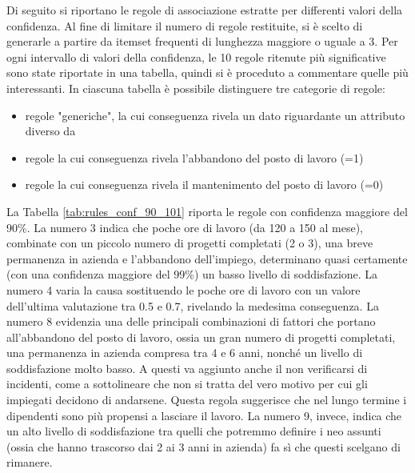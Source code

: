 \documentclass[a4paper]{article}
\begin{document}
Di seguito si riportano le regole di associazione estratte per differenti valori della confidenza. Al fine di limitare il numero di regole restituite, si è scelto di generarle a partire da itemset frequenti di lunghezza maggiore o uguale a 3. 
Per ogni intervallo di valori della confidenza, le 10 regole ritenute più significative sono state riportate in una tabella, quindi si è proceduto a commentare quelle più interessanti. In ciascuna tabella è possibile distinguere tre categorie di regole:
\begin{itemize}
\setlength\itemsep{1pt}
\item regole "generiche", la cui conseguenza rivela un dato riguardante un attributo diverso da 
\item regole la cui conseguenza rivela l'abbandono del posto di lavoro (=1)
\item regole la cui conseguenza rivela il mantenimento del posto di lavoro (=0)
\end{itemize}
\noindent
La Tabella \ref{tab:rules_conf_90_101} riporta le regole con confidenza maggiore del 90\%. La numero 3 indica che poche ore di lavoro (da 120 a 150 al mese), combinate con un piccolo numero di progetti completati (2 o 3), una breve permanenza in azienda e l'abbandono dell'impiego, determinano quasi certamente (con una confidenza maggiore del 99\%) un basso livello di soddisfazione. La numero 4 varia la causa sostituendo le poche ore di lavoro con un valore dell'ultima valutazione tra 0.5 e 0.7, rivelando la medesima conseguenza. 
La numero 8 evidenzia una delle principali combinazioni di fattori che portano all'abbandono del posto di lavoro, ossia un gran numero di progetti completati, una permanenza in azienda compresa tra 4 e 6 anni, nonché un livello di soddisfazione molto basso. A questi va aggiunto anche il non verificarsi di incidenti, come a sottolineare che non si tratta del vero motivo per cui gli impiegati decidono di andarsene. Questa regola suggerisce che nel lungo termine i dipendenti sono più propensi a lasciare il lavoro. La numero 9, invece, indica che un alto livello di soddisfazione tra quelli che potremmo definire i neo assunti (ossia che hanno trascorso dai 2 ai 3 anni in azienda) fa sì che questi scelgano di rimanere.
\end{document}
